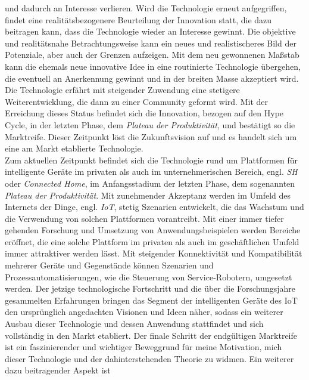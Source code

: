     und dadurch an Interesse verlieren. Wird die Technologie erneut aufgegriffen, findet eine realitätsbezogenere 
    Beurteilung der Innovation statt, die dazu beitragen kann, dass die Technologie wieder an Interesse gewinnt. Die 
    objektive und realitätsnahe Betrachtungsweise kann ein neues und realistischeres Bild der Potenziale, aber auch 
    der Grenzen aufzeigen. Mit dem neu gewonnenen Maßstab kann die ehemals neue innovative Idee in eine routinierte Technologie übergehen, 
    die eventuell an Anerkennung gewinnt und in der breiten Masse akzeptiert wird. Die Technologie erfährt mit steigender 
    Zuwendung eine stetigere Weiterentwicklung, die dann zu einer Community geformt wird. Mit der Erreichung dieses Status 
    befindet sich die Innovation, bezogen auf den Hype Cycle, in der letzten Phase, dem \textit{Plateau der Produktivität}, 
    und bestätigt so die Marktreife. Dieser Zeitpunkt löst die Zukunftsvision auf und es handelt sich um eine am Markt 
    etablierte Technologie. 
    \\ 
    \linebreak
    Zum aktuellen Zeitpunkt befindet sich die Technologie rund um Plattformen für intelligente Geräte im privaten als auch im unternehmerischen 
    Bereich, engl. \textit{\ac{SH}} oder \textit{Connected Home}, im Anfangsstadium der letzten Phase, dem sogenannten 
    \textit{Plateau der Produktivität}. Mit zunehmender Akzeptanz werden im Umfeld des Internets der Dinge, engl. 
    \textit{\acl{IoT}}, stetig Szenarien entwickelt, die das Wachstum und die Verwendung von solchen Plattformen vorantreibt. 
    Mit einer immer tiefer gehenden Forschung und Umsetzung von Anwendungsbeispielen werden Bereiche eröffnet, die 
    eine solche Plattform im privaten als auch im geschäftlichen Umfeld immer attraktiver werden lässt. Mit steigender  
    Konnektivität und Kompatibilität mehrerer Geräte und Gegenstände können Szenarien und Prozessautomatisierungen, wie die 
    Steuerung von Service-Robotern, umgesetzt werden. Der jetzige technologische Fortschritt und die über die Forschungsjahre 
    gesammelten Erfahrungen bringen das Segment der intelligenten Geräte des \acs{IoT} den ursprünglich angedachten 
    Visionen und Ideen näher, sodass ein weiterer Ausbau dieser Technologie und dessen Anwendung stattfindet und sich 
    vollständig in den Markt etabliert. Der finale Schritt der endgültigen Marktreife ist ein faszinierender und wichtiger Beweggrund 
    für meine Motivation, mich dieser Technologie und der dahinterstehenden Theorie zu widmen. Ein weiterer dazu beitragender Aspekt ist 
